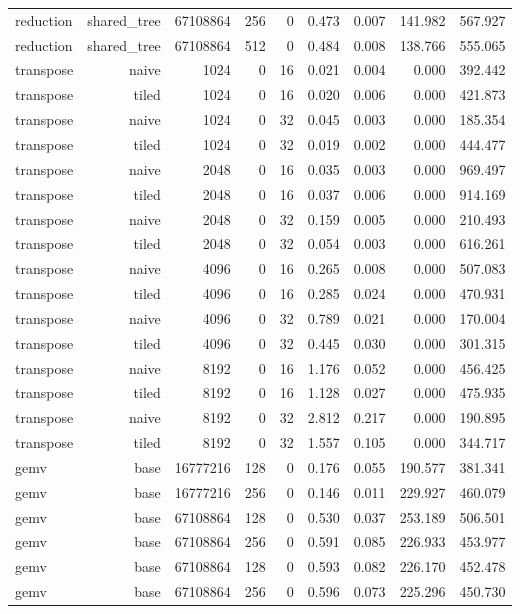 \begin{longtable}{lrrrrrrrr}
reduction & shared\_tree & 67108864 & 256 & 0 & 0.473 & 0.007 & 141.982 & 567.927 \\
reduction & shared\_tree & 67108864 & 512 & 0 & 0.484 & 0.008 & 138.766 & 555.065 \\
transpose & naive & 1024 & 0 & 16 & 0.021 & 0.004 & 0.000 & 392.442 \\
transpose & tiled & 1024 & 0 & 16 & 0.020 & 0.006 & 0.000 & 421.873 \\
transpose & naive & 1024 & 0 & 32 & 0.045 & 0.003 & 0.000 & 185.354 \\
transpose & tiled & 1024 & 0 & 32 & 0.019 & 0.002 & 0.000 & 444.477 \\
transpose & naive & 2048 & 0 & 16 & 0.035 & 0.003 & 0.000 & 969.497 \\
transpose & tiled & 2048 & 0 & 16 & 0.037 & 0.006 & 0.000 & 914.169 \\
transpose & naive & 2048 & 0 & 32 & 0.159 & 0.005 & 0.000 & 210.493 \\
transpose & tiled & 2048 & 0 & 32 & 0.054 & 0.003 & 0.000 & 616.261 \\
transpose & naive & 4096 & 0 & 16 & 0.265 & 0.008 & 0.000 & 507.083 \\
transpose & tiled & 4096 & 0 & 16 & 0.285 & 0.024 & 0.000 & 470.931 \\
transpose & naive & 4096 & 0 & 32 & 0.789 & 0.021 & 0.000 & 170.004 \\
transpose & tiled & 4096 & 0 & 32 & 0.445 & 0.030 & 0.000 & 301.315 \\
transpose & naive & 8192 & 0 & 16 & 1.176 & 0.052 & 0.000 & 456.425 \\
transpose & tiled & 8192 & 0 & 16 & 1.128 & 0.027 & 0.000 & 475.935 \\
transpose & naive & 8192 & 0 & 32 & 2.812 & 0.217 & 0.000 & 190.895 \\
transpose & tiled & 8192 & 0 & 32 & 1.557 & 0.105 & 0.000 & 344.717 \\
gemv & base & 16777216 & 128 & 0 & 0.176 & 0.055 & 190.577 & 381.341 \\
gemv & base & 16777216 & 256 & 0 & 0.146 & 0.011 & 229.927 & 460.079 \\
gemv & base & 67108864 & 128 & 0 & 0.530 & 0.037 & 253.189 & 506.501 \\
gemv & base & 67108864 & 256 & 0 & 0.591 & 0.085 & 226.933 & 453.977 \\
gemv & base & 67108864 & 128 & 0 & 0.593 & 0.082 & 226.170 & 452.478 \\
gemv & base & 67108864 & 256 & 0 & 0.596 & 0.073 & 225.296 & 450.730 \\

\end{longtable}
